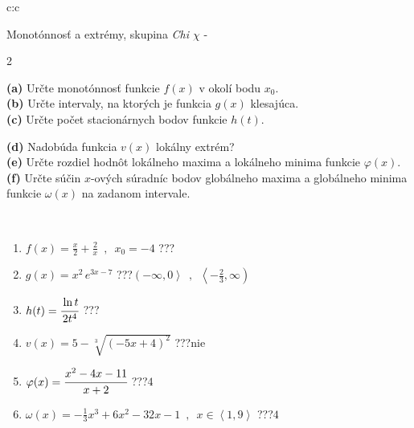 \documentclass[10pt]{report}
\begin{document}
\newpage
\thispagestyle{empty}
\begin{tabular}{c:c}
\begin{minipage}[c][104.5mm][t]{0.5\linewidth}
\begin{center}
\vspace{7mm}
{\huge Monotónnosť a extrémy, skupina \textit{Chi $\chi$} -}\\[5mm]
\begin{minipage}{0.95\linewidth}
\begin{center}
{\small \begin{multicols}{2} \raggedright
\textbf{(a)} Určte monotónnosť funkcie \(f(x)\) v okolí bodu \(x_0\). \\[1mm]
\textbf{(b)} Určte intervaly, na ktorých je funkcia \(g(x)\) klesajúca. \\[1mm]
\textbf{(c)} Určte počet stacionárnych bodov funkcie \(h(t)\). \par \columnbreak
\textbf{(d)} Nadobúda funkcia \(v(x)\) lokálny extrém? \\[1mm]
\textbf{(e)} Určte rozdiel hodnôt lokálneho maxima a lokálneho minima funkcie \(\varphi(x)\). \\[1mm]
\textbf{(f)} Určte súčin \(x\)-ových súradníc bodov globálneho maxima a globálneho minima funkcie \(\omega(x)\) na zadanom intervale. \\[1mm]
\end{multicols}
}
\end{center}
\end{minipage}
\\[4mm]
\begin{minipage}{0.79\linewidth}
\begin{center}
\begin{varwidth}{\linewidth}
\begin{enumerate}
\normalsize
\item $f(x)=\frac{x}{2}+\frac{2}{x} \enspace , \enspace x_0=-4$\quad \dotfill\; ???\;\dotfill \quad {}
\item $g(x)=x^2\, e^{3x-7}$\quad \dotfill\; ???\;\dotfill \quad $\left(-\infty , 0\right\rangle\enspace , \enspace \left\langle-\frac{2}{3} , \infty\right)$
\item $h(t)=\cfrac{\ln t}{2t^4}$\quad \dotfill\; ???\;\dotfill {}
\item $v(x)=5-\sqrt[3]{(-5x+4)^2}$\quad \dotfill\; ???\;\dotfill \quad $\text{nie}$
\item $\varphi(x)=\cfrac{x^2-4x-11}{x+2}$\quad \dotfill\; ???\;\dotfill \quad $4$
\item $\omega(x)=-\frac{1}{3}x^3+6x^2-32x-1 \enspace , \enspace x\in\left\langle1 , 9\right\rangle$\quad \dotfill\; ???\;\dotfill \quad $4$

\end{enumerate}
\end{varwidth}
\end{center}
\end{minipage}
\end{center}
\end{minipage}
\end{tabular}
\end{document}
